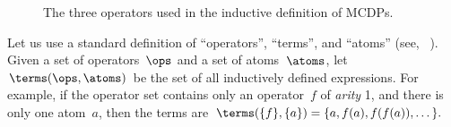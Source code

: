 \begin{figure}[h]
  \centering{}\hfill{}\hfill{}\hfill{}\smallskip{}
  \caption{\label{fig:series-par-loop}The three operators used in the inductive
  definition of MCDPs.}
\end{figure}

Let us use a standard definition of ``operators'', ``terms'',
and ``atoms'' (see, \eg~\cite[p.41]{jezek08}). Given a set
of operators~$\ops$ and a set of atoms~$\atoms$, let~$\terms(\ops,\atoms)$
be the set of all inductively defined expressions. For example, if
the operator set contains only an operator~$f$ of \emph{arity} 1,
and there is only one atom~$a$, then the terms are $\terms(\{f\},\{a\})=\{a,f(a),f(f(a)),\dots\}.$



